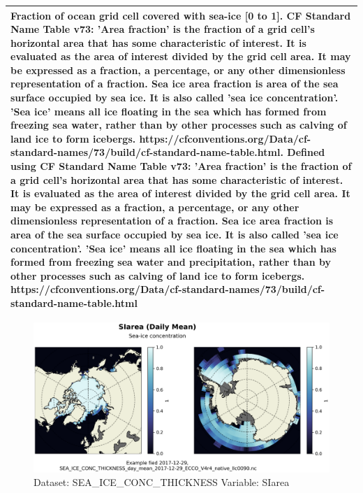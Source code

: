 \begin{longtable}{|p{}|p{}|p{}|p{}|}
\multicolumn{4}{|p{1\textwidth}|}{Fraction of ocean grid cell covered with sea-ice [0 to 1]. CF Standard Name Table v73:  'Area fraction' is the fraction of a grid cell's horizontal area that has some characteristic of interest. It is evaluated as the area of interest divided by the grid cell area. It may be expressed as a fraction, a percentage, or any other dimensionless representation of a fraction. Sea ice area fraction is area of the sea surface occupied by sea ice. It is also called 'sea ice concentration'. 'Sea ice' means all ice floating in the sea which has formed from freezing sea water, rather than by other processes such as calving of land ice to form icebergs. https://cfconventions.org/Data/cf-standard-names/73/build/cf-standard-name-table.html. Defined using CF Standard Name Table v73: 'Area fraction' is the fraction of a grid cell's horizontal area that has some characteristic of interest. It is evaluated as the area of interest divided by the grid cell area. It may be expressed as a fraction, a percentage, or any other dimensionless representation of a fraction. Sea ice area fraction is area of the sea surface occupied by sea ice. It is also called 'sea ice concentration'. 'Sea ice' means all ice floating in the sea which has formed from freezing sea water and precipitation, rather than by other processes such as calving of land ice to form icebergs. https://cfconventions.org/Data/cf-standard-names/73/build/cf-standard-name-table.html} \\ \hline
\end{longtable}

\begin{figure}[H]
\centering
\includegraphics[width=\textwidth]{../images/plots/native_plots/Sea-Ice_and_Snow_Concentration_and_Thickness/SIarea.png}
\caption{Dataset: SEA\_ICE\_CONC\_THICKNESS Variable: SIarea}
\label{tab:table-SEA_ICE_CONC_THICKNESS_SIarea-Plot}
\end{figure}
\pagebreak
